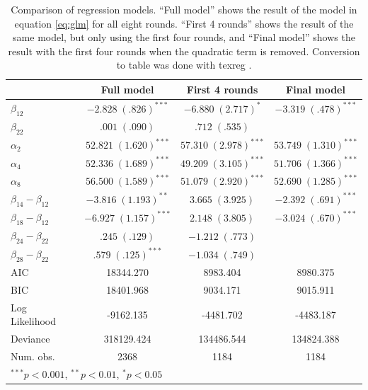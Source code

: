 \begin{table}[h]
\begin{center}
\begin{tabular}{l c c c }
\hline
 & Full model & First 4 rounds & Final model   \\
\hline
$\beta_{12}$			& $-2.828 \; (.826)^{***}$  & $-6.880 \; (2.717)^{*}$   & $-3.319 \; (.478)^{***}$  \\
$\beta_{22}$			& $.001 \; (.090)$        & $.712 \; (.535)$          &                           \\
$\alpha_{2}$			& $52.821 \; (1.620)^{***}$ & $57.310 \; (2.978)^{***}$ & $53.749 \; (1.310)^{***}$ \\
$\alpha_{4}$			& $52.336 \; (1.689)^{***}$ & $49.209 \; (3.105)^{***}$ & $51.706 \; (1.366)^{***}$ \\
$\alpha_{8}$			& $56.500 \; (1.589)^{***}$ & $51.079 \; (2.920)^{***}$ & $52.690 \; (1.285)^{***}$ \\
$\beta_{14}-\beta_{12}$  & $-3.816 \; (1.193)^{**}$  & $3.665 \; (3.925)$        & $-2.392 \; (.691)^{***}$  \\
$\beta_{18}-\beta_{12}$  & $-6.927 \; (1.157)^{***}$ & $2.148 \; (3.805)$        & $-3.024 \; (.670)^{***}$  \\
$\beta_{24}-\beta_{22}$  & $.245 \; (.129)$          & $-1.212 \; (.773)$        &                           \\
$\beta_{28}-\beta_{22}$  & $.579 \; (.125)^{***}$    & $-1.034 \; (.749)$        &                           \\
\hline
AIC                     & 18344.270                 & 8983.404                  & 8980.375                  \\
BIC                     & 18401.968                 & 9034.171                  & 9015.911                  \\
Log Likelihood          & -9162.135                 & -4481.702                 & -4483.187                 \\
Deviance                & 318129.424                & 134486.544                & 134824.388                \\
Num. obs.               & 2368                      & 1184                      & 1184                      \\
\hline
\multicolumn{4}{l}{\scriptsize{$^{***}p<0.001$, $^{**}p<0.01$, $^*p<0.05$}}
\end{tabular}
\caption{Comparison of regression models. ``Full model'' shows the result of the model in equation \eqref{eq:glm} for all eight rounds. ``First 4 rounds'' shows the result of the same model, but only using the first four rounds, and ``Final model'' shows the result with the first four rounds when the quadratic term is removed. Conversion to table was done with texreg \cite{leifeld2013texreg}.}
\label{tab:2}
\end{center}
\end{table}

